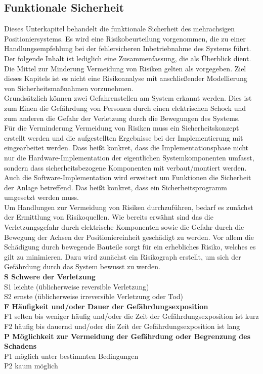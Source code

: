 \documentclass[../../../Bachelorarbeit.tex]{subfiles}
\begin{document}
\subsection{Funktionale Sicherheit} \label{sicherheit}
Dieses Unterkapitel behandelt die funktionale Sicherheit des mehrachsigen Positioniersystems. Es wird eine Risikobeurteilung vorgenommen, die zu einer Handlungsempfehlung bei der fehlersicheren Inbetriebnahme des Systems führt. Der folgende Inhalt ist lediglich eine Zusammenfassung, die als Überblick dient. Die Mittel zur Minderung \bzw Vermeidung von Risiken gelten als vorgegeben. Ziel dieses Kapitels ist es nicht eine Risikoanalyse mit anschließender Modellierung von Sicherheitsmaßnahmen vorzunehmen.\\
\bigskip \newline
Grundsätzlich können zwei Gefahrenstellen am System erkannt werden. Dies ist zum Einen die Gefährdung von Personen durch einen elektrischen Schock und zum anderen die Gefahr der Verletzung durch die Bewegungen des Systems.\\
Für die Verminderung \bzw Vermeidung von Risiken muss ein Sicherheitskonzept erstellt werden und die aufgestellten Ergebnisse bei der Implementierung mit eingearbeitet werden. Dass heißt konkret, dass die Implementationsphase nicht nur die Hardware-Implementation der eigentlichen Systemkomponenten umfasst, sondern dass sicherheitsbezogene Komponenten mit verbaut/montiert werden. Auch die Software-Implementation wird erweitert um Funktionen die Sicherheit der Anlage betreffend. Das heißt konkret, dass ein Sicherheitsprogramm umgesetzt werden muss.\\
Um Handlungen zur Vermeidung von Risiken durchzuführen, bedarf es zunächst der Ermittlung von Risikoquellen. Wie bereits erwähnt sind das die Verletzungsgefahr durch elektrische Komponenten sowie die Gefahr durch die Bewegung der Achsen der Positioniereinheit geschädigt zu werden. Vor allem die Schädigung durch bewegende Bauteile sorgt für ein erhebliches Risiko, welches es gilt zu minimieren. Dazu wird zunächst ein Risikograph erstellt, um sich der Gefährdung durch das System bewusst zu werden.\\
\bigskip \newline
\textbf{S Schwere der Verletzung}\\
S1 leichte (üblicherweise reversible Verletzung)\\
S2 ernste (üblicherweise irreversible Verletzung oder Tod)\\
\textbf{F Häufigkeit und/oder Dauer der Gefährdungsexposition}\\
F1 selten bis weniger häufig und/oder die Zeit der Gefährdungsexposition ist kurz\\
F2 häufig bis dauernd und/oder die Zeit der Gefährdungsexposition ist lang\\
\textbf{P Möglichkeit zur Vermeidung der Gefährdung oder Begrenzung des Schadens}\\
P1 möglich unter bestimmten Bedingungen\\
P2 kaum möglich
\end{document}
